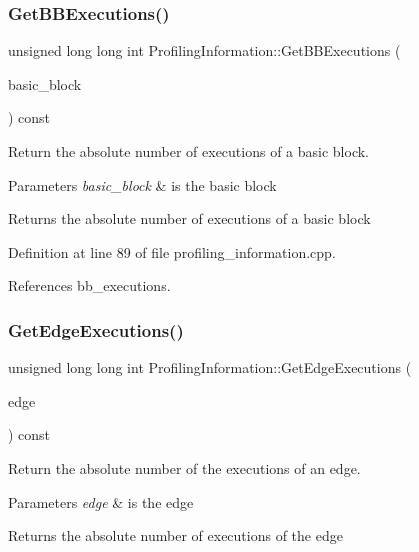 \subsubsection{\texorpdfstring{Get\+B\+B\+Executions()}{GetBBExecutions()}}
{\footnotesize\ttfamily unsigned long long int Profiling\+Information\+::\+Get\+B\+B\+Executions (\begin{DoxyParamCaption}\item[{const \hyperlink{graph_8hpp_abefdcf0544e601805af44eca032cca14}{vertex}}]{basic\+\_\+block }\end{DoxyParamCaption}) const}



Return the absolute number of executions of a basic block. 


\begin{DoxyParams}{Parameters}
{\em basic\+\_\+block} & is the basic block \\
\hline
\end{DoxyParams}
\begin{DoxyReturn}{Returns}
the absolute number of executions of a basic block 
\end{DoxyReturn}


Definition at line 89 of file profiling\+\_\+information.\+cpp.



References bb\+\_\+executions.

\mbox{\label{classProfilingInformation_a4ca13cb8f2a184c1c72959737a0375fa}} 
\subsubsection{\texorpdfstring{Get\+Edge\+Executions()}{GetEdgeExecutions()}}
{\footnotesize\ttfamily unsigned long long int Profiling\+Information\+::\+Get\+Edge\+Executions (\begin{DoxyParamCaption}\item[{const \hyperlink{graph_8hpp_a9eb9afea34e09f484b21f2efd263dd48}{Edge\+Descriptor}}]{edge }\end{DoxyParamCaption}) const}



Return the absolute number of the executions of an edge. 


\begin{DoxyParams}{Parameters}
{\em edge} & is the edge \\
\hline
\end{DoxyParams}
\begin{DoxyReturn}{Returns}
the absolute number of executions of the edge 
\end{DoxyReturn}


